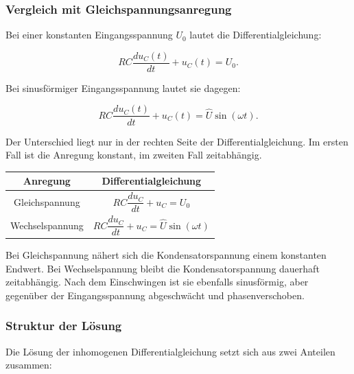 \subsubsection{Vergleich mit Gleichspannungsanregung}
\label{subsubsec:rc-vergleich-gleichspannung-wechselspannung}

Bei einer konstanten Eingangsspannung \(U_0\) lautet die Differentialgleichung:

\begin{equation}
	RC \frac{du_C(t)}{dt}
	+
	u_C(t)
	=
	U_0.
	\label{eq:rc-dgl-gleichspannung}
\end{equation}

Bei sinusförmiger Eingangsspannung lautet sie dagegen:

\begin{equation}
	RC \frac{du_C(t)}{dt}
	+
	u_C(t)
	=
	\hat{U}\sin(\omega t).
	\label{eq:rc-dgl-wechselspannung-vergleich}
\end{equation}

Der Unterschied liegt nur in der rechten Seite der Differentialgleichung.
Im ersten Fall ist die Anregung konstant, im zweiten Fall zeitabhängig.

\begin{center}
	\begin{tabular}{c|c}
		Anregung & Differentialgleichung \\ \hline
		Gleichspannung & \(RC\dfrac{du_C}{dt}+u_C=U_0\) \\[8pt]
		Wechselspannung & \(RC\dfrac{du_C}{dt}+u_C=\hat{U}\sin(\omega t)\)
	\end{tabular}
\end{center}

\begin{DidacticBox}
	\label{box:rc-gleichspannung-wechselspannung-unterschied}
	Bei Gleichspannung nähert sich die Kondensatorspannung einem konstanten
	Endwert. Bei Wechselspannung bleibt die Kondensatorspannung dauerhaft
	zeitabhängig. Nach dem Einschwingen ist sie ebenfalls sinusförmig, aber
	gegenüber der Eingangsspannung abgeschwächt und phasenverschoben.
\end{DidacticBox}

\subsubsection{Struktur der Lösung}
\label{subsubsec:rc-sinus-struktur-der-loesung}

Die Lösung der inhomogenen Differentialgleichung setzt sich aus zwei Anteilen
zusammen:

